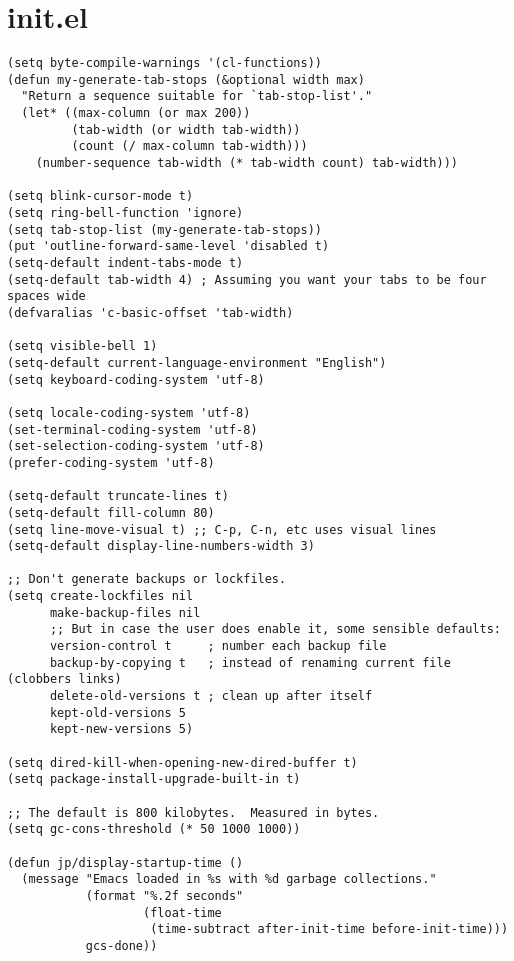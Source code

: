 \documentclass[11pt]{article}
\begin{document}
\section{init.el}
\label{sec:orge898442}
\begin{verbatim}
(setq byte-compile-warnings '(cl-functions))
(defun my-generate-tab-stops (&optional width max)
  "Return a sequence suitable for `tab-stop-list'."
  (let* ((max-column (or max 200))
         (tab-width (or width tab-width))
         (count (/ max-column tab-width)))
    (number-sequence tab-width (* tab-width count) tab-width)))

(setq blink-cursor-mode t)
(setq ring-bell-function 'ignore)
(setq tab-stop-list (my-generate-tab-stops))
(put 'outline-forward-same-level 'disabled t)
(setq-default indent-tabs-mode t)
(setq-default tab-width 4) ; Assuming you want your tabs to be four spaces wide
(defvaralias 'c-basic-offset 'tab-width)

(setq visible-bell 1)
(setq-default current-language-environment "English")
(setq keyboard-coding-system 'utf-8)

(setq locale-coding-system 'utf-8)
(set-terminal-coding-system 'utf-8)
(set-selection-coding-system 'utf-8)
(prefer-coding-system 'utf-8)

(setq-default truncate-lines t)
(setq-default fill-column 80)
(setq line-move-visual t) ;; C-p, C-n, etc uses visual lines
(setq-default display-line-numbers-width 3)

;; Don't generate backups or lockfiles.
(setq create-lockfiles nil
      make-backup-files nil
      ;; But in case the user does enable it, some sensible defaults:
      version-control t     ; number each backup file
      backup-by-copying t   ; instead of renaming current file (clobbers links)
      delete-old-versions t ; clean up after itself
      kept-old-versions 5
      kept-new-versions 5)

(setq dired-kill-when-opening-new-dired-buffer t)
(setq package-install-upgrade-built-in t)

;; The default is 800 kilobytes.  Measured in bytes.
(setq gc-cons-threshold (* 50 1000 1000))

(defun jp/display-startup-time ()
  (message "Emacs loaded in %s with %d garbage collections."
           (format "%.2f seconds"
                   (float-time
                    (time-subtract after-init-time before-init-time)))
           gcs-done))


\end{verbatim}
\end{document}

